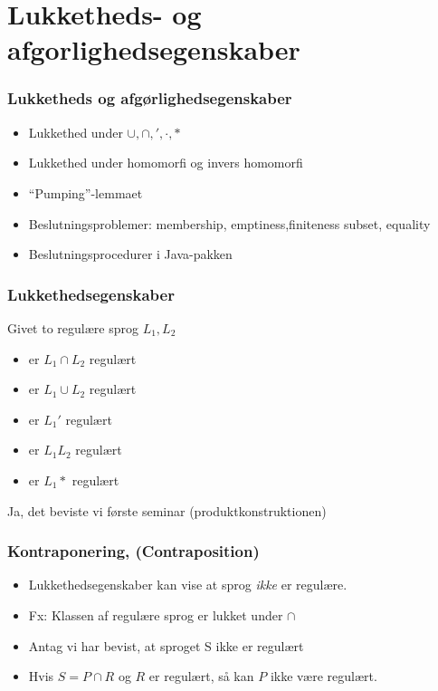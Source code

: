 \section{Lukketheds- og afgorlighedsegenskaber}

\begin{frame}
  \frametitle{Lukketheds og afgørlighedsegenskaber}
  \begin{itemize}
  \item Lukkethed under $\cup, \cap, ', \cdot, *$ 
  \item Lukkethed under homomorfi og invers 
    homomorfi 
  \item ``Pumping''-lemmaet 
  \item Beslutningsproblemer: membership,  
    emptiness,finiteness subset, equality 
  \item Beslutningsprocedurer i Java-pakken
  \end{itemize}
\end{frame}

\begin{frame}
\frametitle{Lukkethedsegenskaber}
Givet to regulære sprog $L_1, L_2$
\begin{itemize}[<+->]
\item er $L_1 \cap L_2$ regulært
\item er $L_1 \cup L_2$ regulært
\item er $L_1'$ regulært
\item er $L_1L_2$ regulært
\item er $L_1*$ regulært
\end{itemize}
Ja, det beviste vi første seminar (produktkonstruktionen)
\end{frame}

\begin{frame}
\frametitle{Kontraponering, (Contraposition)}
\begin{itemize}[<+->]
\item Lukkethedsegenskaber kan vise at sprog \emph{ikke} er regulære.
\item Fx: Klassen af regulære sprog er lukket under $\cap$
\item Antag vi har bevist, at sproget S ikke er  
regulært 
\item Hvis $S = P \cap R$ og $R$ er regulært, så kan  
$P$ ikke være regulært.
\end{itemize}
\end{frame}

